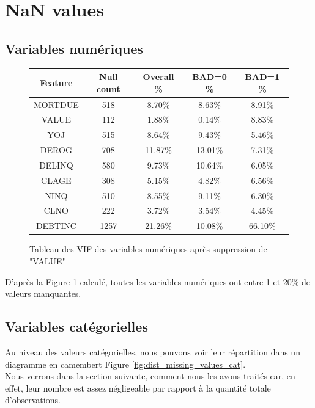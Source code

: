 \documentclass[a4paper,12pt]{report}
\begin{document}
\section{NaN values}

\subsection{Variables numériques}

\begin{figure}[h!]
  \begin{center}
    \begin{tabular}{||c c c c c||} 
     \hline
     Feature & Null count & Overall \% & BAD=0 \% & BAD=1 \%\\ [0.5ex]
     \hline
     MORTDUE & 518 & 8.70\% & 8.63\% & 8.91\% \\
     \hline
     VALUE & 112 & 1.88\% & 0.14\% & 8.83\% \\
     \hline
     YOJ & 515 & 8.64\% & 9.43\% & 5.46\% \\
     \hline
     DEROG & 708 & 11.87\% & 13.01\% & 7.31\% \\
     \hline
     DELINQ & 580 & 9.73\% & 10.64\% & 6.05\% \\
     \hline
     CLAGE & 308 & 5.15\% & 4.82\% & 6.56\% \\
     \hline
     NINQ & 510 & 8.55\% & 9.11\% & 6.30\% \\
     \hline
     CLNO & 222 & 3.72\% & 3.54\% & 4.45\% \\
     \hline
     DEBTINC & 1257 & 21.26\% & 10.08\% & 66.10\% \\ [1ex] 
     \hline
    \end{tabular}
  \end{center}
  \caption{Tableau des VIF des variables numériques après suppression de "VALUE"}
  \label{fig:tab_nan_count_num_var}
\end{figure}

\bigbreak

D'après la Figure \ref{fig:tab_nan_count_num_var} calculé, toutes les variables numériques ont entre 1 et 20\% de valeurs manquantes.\\


\subsection{Variables catégorielles}

Au niveau des valeurs catégorielles, nous pouvons voir leur répartition dans un diagramme en camembert Figure \ref{fig:dist_missing_values_cat}.\\
Nous verrons dans la section suivante, comment nous les avons traités car, en effet, leur nombre est assez négligeable par rapport à la quantité totale d'observations.
\end{document}
